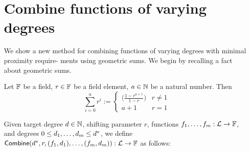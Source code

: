 \section{Combine functions of varying degrees}\label{sec:combine}
We show a new method for combining functions of varying degrees with minimal proximity require- ments using geometric sums. We begin by recalling a fact about geometric sums.

\begin{fact}\label{fact:geometric_sum}
    Let $\mathbb{F}$ be a field, $r\in\mathbb{F}$ be a field element, $a\in\mathbb{N}$ be a natural number. Then
    \[
        \sum_{i=0}^{a}r^i:=
        \begin{cases}
        \Big(\frac{1-r^{a+1}}{1-r}\Big) & r\neq 1 \\
        a+1 & r=1
        \end{cases}
    \]
\end{fact}

\begin{definition}
    Given target degree $d\in\mathbb{N}$, shifting parameter $r$, functions $f_1,\ldots,f_m:\mathcal{L}\rightarrow\mathbb{F}$, and degrees $0\leq d_1,\ldots,d_m\leq {d}^*$, we define $\mathsf{Combine}(d^*,r,(f_1,d_1),\ldots,(f_m,d_m)):\mathcal{L}\rightarrow\mathbb{F}$ as follows:
    
\end{definition}